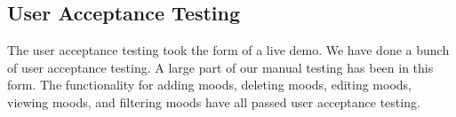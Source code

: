 \subsection{User Acceptance Testing}

The user acceptance testing took the form of a live demo.
We have done a bunch of user acceptance testing. A large part of our manual
testing has been in this form. The functionality for adding moods, deleting
moods, editing moods, viewing moods, and filtering moods have all passed user
acceptance testing. 



